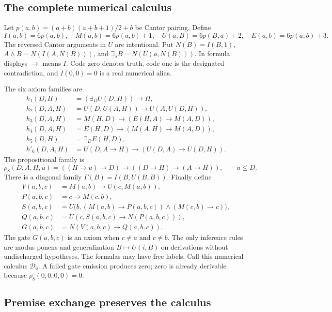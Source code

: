 \subsection{The complete numerical calculus}

Let $p(a,b)=(a+b)(a+b+1)/2+b$ be Cantor pairing. Define
\[
 I(a,b)=6p(a,b),\quad M(a,b)=6p(a,b)+1,\quad
 U(a,B)=6p(B,a)+2,\quad E(a,b)=6p(a,b)+3.
\]
The reversed Cantor arguments in $U$ are intentional. Put
$N(B)=I(B,1)$, $A\wedge B=N(I(A,N(B)))$, and
$\exists_a B=N(U(a,N(B)))$. In formula displays $\to$ means $I$.
Code zero denotes truth, code one is the designated contradiction, and
$I(0,0)=0$ is a real numerical alias.

The six axiom families are
\begin{align*}
 h_1(D,H)&=(\exists_D U(D,H))\to H,\\
 h_2(D,A,H)&=U(D,U(A,H))\to U(A,U(D,H)),\\
 h_3(D,A,H)&=M(H,D)\to(E(H,A)\to M(A,D)),\\
 h_4(D,A,H)&=E(H,D)\to(M(A,H)\to M(A,D)),\\
 h_5(D,H)&=\exists_D E(H,D),\\
 h'_6(D,A,H)&=U(D,A\to H)\to(U(D,A)\to U(D,H)).
\end{align*}
The propositional family is
\[
 \rho_8(D,A,H,u)=((H\to u)\to D)\to((D\to H)\to(A\to H)),
 \qquad u\leq D.
\]
There is a diagonal family $\Gamma(B)=I(B,U(B,B))$. Finally define
\begin{align*}
 V(a,b,c)&=M(a,b)\to U(c,M(a,b)),\\
 P(a,b,c)&=c\to M(c,b),\\
 S(a,b,c)&=U\bigl(b,(M(a,b)\to P(a,b,c))
                         \wedge(M(c,b)\to c)\bigr),\\
 Q(a,b,c)&=U(c,S(a,b,c)\to N(P(a,b,c))),\\
 G(a,b,c)&=N(V(a,b,c)\to Q(a,b,c)).
\end{align*}
The gate $G(a,b,c)$ is an axiom when $c\ne a$ and $c\ne b$.
The only inference rules are modus ponens and generalization
$B\mapsto U(i,B)$ on derivations without undischarged hypotheses. The
formulas may have free labels. Call this numerical calculus
$\mathcal D_6$. A failed gate emission produces zero; zero is already
derivable because $\rho_8(0,0,0,0)=0$.

\subsection{Premise exchange preserves the calculus}

